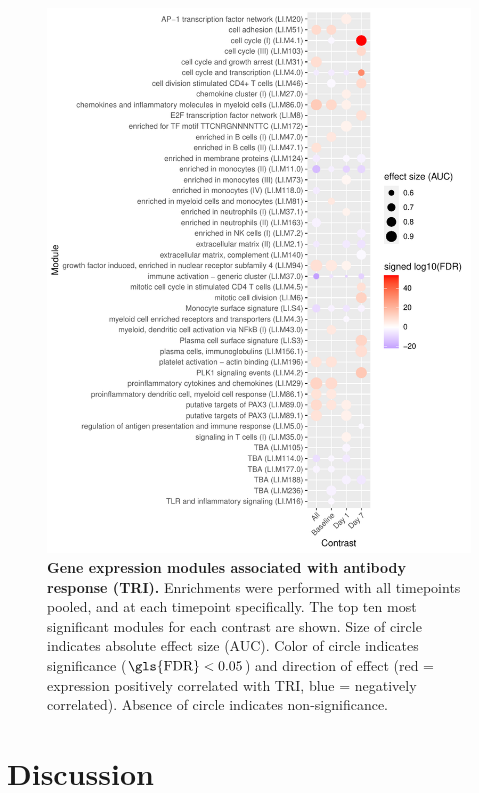 \begin{figure}
    \includegraphics[width=1.0\textwidth]{mainmatter/figures/chapter_02/compare_dge_eqtl.tmodDotPlot.DGE.TRI.pdf}
    \caption{
        \textbf{Gene expression modules associated with antibody response (\gls{TRI}).}
        Enrichments were performed with all timepoints pooled, and at each timepoint specifically.
        The top ten most significant modules for each contrast are shown.
        Size of circle indicates absolute effect size (\gls{AUC}). 
        Color of circle indicates significance ($\text{\gls{FDR}} < 0.05$) and direction of effect (red = expression positively correlated with \gls{TRI}, blue = negatively correlated).
        Absence of circle indicates non-significance.
    }
    \label{fig:hird_tmodDotPlot_TRI}
\end{figure}

\section{Discussion}

